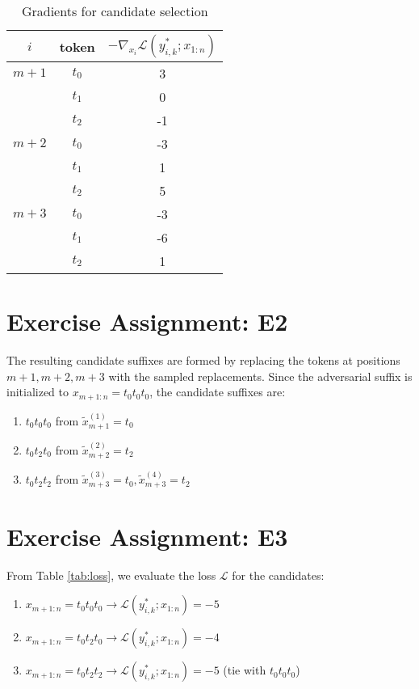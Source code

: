 \documentclass{article}
\begin{document}
\begin{table}[h!]
    \centering
    \caption{Gradients for candidate selection}
    \label{tab:gradients}
    \begin{tabular}{ccc}
        \toprule
        $i$ & token & $-\nabla_{x_i} \mathcal{L}(y^*_{i,k};x_{1:n})$ \\
        \midrule
        $m + 1$ & $t_0$ & 3 \\
            & $t_1$ & 0 \\
            & $t_2$ & -1 \\
        \hline
        $m + 2$ & $t_0$ & -3 \\
            & $t_1$ & 1 \\
            & $t_2$ & 5 \\
        \hline
        $m + 3$ & $t_0$ & -3 \\
            & $t_1$ & -6 \\
            & $t_2$ & 1 \\
        \bottomrule
    \end{tabular}
\end{table}

\section{Exercise Assignment: E2}\label{sec:e2}
The resulting candidate suffixes are formed by replacing the tokens at positions \(m+1, m+2, m+3\) with the sampled replacements. Since the adversarial suffix is initialized to $x_{m+1:n} = t_0 t_0 t_0$, the candidate suffixes are:
\begin{enumerate}
    \item \(t_0t_0t_0\) from $\tilde{x}_{m+1}^{(1)} = t_0$
    \item \(t_0t_2t_0\) from $\tilde{x}_{m+2}^{(2)} = t_2$
    \item \(t_0t_2t_2\) from $\tilde{x}_{m+3}^{(3)} = t_0, \tilde{x}_{m+3}^{(4)} = t_2$
\end{enumerate}

\section{Exercise Assignment: E3}\label{sec:e3}
From Table \ref{tab:loss}, we evaluate the loss \(\mathcal{L}\) for the candidates:
\begin{enumerate}
    \item \(x_{m+1:n} = t_0t_0t_0 \rightarrow \mathcal{L}(y^*_{i,k}; x_{1:n}) = -5\)
    \item \(x_{m+1:n} = t_0t_2t_0 \rightarrow \mathcal{L}(y^*_{i,k}; x_{1:n}) = -4\)
    \item \(x_{m+1:n} = t_0t_2t_2 \rightarrow \mathcal{L}(y^*_{i,k}; x_{1:n}) = -5\) (tie with \(t_0t_0t_0\))
\end{enumerate}
\end{document}
